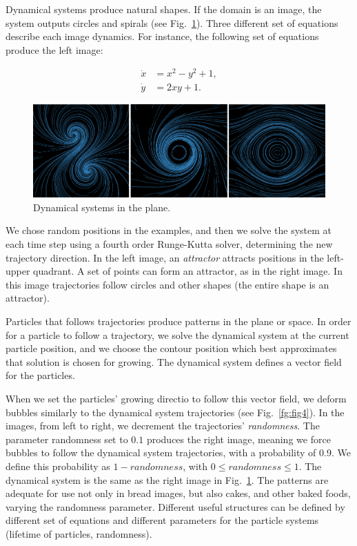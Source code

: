 \documentclass[oneside,a4paper,english,links]{amca}
\begin{document}
Dynamical systems produce natural shapes. If the domain is an image, the system outputs circles and spirals (see
Fig.~\ref{fg:fig3}). Three different set of equations
describe each image dynamics. For instance, the following set of equations produce the left
image:

\begin{equation} \label{eq:simple}  
  \begin{aligned}
    \dot{x} &= x^{2}-y^{2}+1,\\
    \dot{y} &= 2xy+1.
  \end{aligned}
\end{equation}


\begin{figure}[htb!]
  \centerline{\includegraphics[scale=0.28]{fig3}}
  \caption{Dynamical systems in the plane.}
  \label{fg:fig3}
\end{figure}


We chose random positions in the examples, and then we solve the system at each time step using a fourth order Runge-Kutta solver, determining the new trajectory direction. In the left image, an {\em attractor} attracts positions in the left-upper quadrant. A set of points can form an attractor, as in the right image. In this image trajectories follow circles and other shapes (the entire shape is an attractor).

Particles that follows trajectories produce patterns in the plane or space. In order for a particle to follow a trajectory, we solve the dynamical system at the current particle position, and we choose the contour position which best approximates that solution is chosen for growing. The dynamical system defines a vector field for the particles.

When we set the particles' growing directio to follow this vector field, we deform bubbles similarly to the dynamical system trajectories (see Fig.~\ref{fg:fig4}). In the
images, from left to right, we decrement the trajectories' {\em randomness}. The parameter randomness set to $0.1$ produces the right image, meaning
we force bubbles to follow the dynamical system
trajectories, with a probability of 0.9. We define this probability as
$1-randomness$, with $0 \leq randomness \leq 1$. The dynamical system
is the same as the right image in Fig.~\ref{fg:fig3}.  The
patterns are adequate for use not only in bread images, but also
cakes, and other baked foods, varying the randomness
parameter. Different useful structures can be defined by different set of equations and different parameters for the
particle systems (lifetime of particles, randomness).
\end{document}
